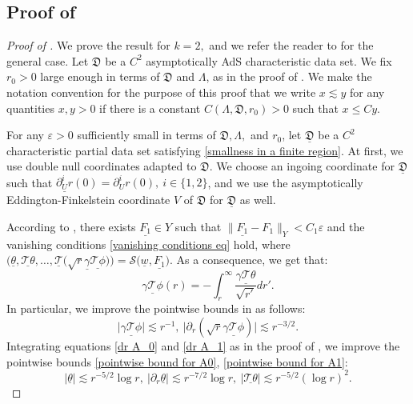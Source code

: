 \documentclass[11pt]{article}
\numberwithin{equation}{section}
\begin{document}
\subsection{Proof of }\label{extending local perturbations section}

\begin{proof}[Proof of ] We prove the result for $k=2,$ and we refer the reader to  for the general case. Let $\mathfrak{D}$ be a $C^2$ asymptotically AdS characteristic data set. We fix $r_0>0$ large enough in terms of $\mathfrak{D}$ and $\Lambda$, as in the proof of . We make the notation convention for the purpose of this proof that we write $x\lesssim y$ for any quantities $x,y>0$ if there is a constant $C(\Lambda,\mathfrak{D},r_0)>0$ such that $x\leq Cy.$

For any $\varepsilon>0$ sufficiently small in terms of $\mathfrak{D},\Lambda,$ and $r_0$, let $\underline{\mathfrak{D}}$ be a $C^2$ characteristic partial data set satisfying \eqref{smallness in a finite region}. At first, we use double null coordinates adapted to $\mathfrak{D}.$ We choose an ingoing coordinate for $\underline{\mathfrak{D}}$ such that $\underline{\partial_U^ir}(0)=\partial_U^ir(0),\ i\in\{1,2\}$, and we use the asymptotically Eddington-Finkelstein coordinate $V$ of  $\mathfrak{D}$ for $\underline{\mathfrak{D}}$ as well.

According to , there exists $\underline{F_1}\in Y$ such that $\|\underline{F_1}-F_1\|_{Y}<C_1\varepsilon$ and the vanishing conditions \eqref{vanishing conditions eq} hold, where $\big(\underline{\theta},\underline{\mathcal{T}\theta},\ldots,\underline{\mathcal{T}}\big(\sqrt{r}\underline{\gamma}\underline{\mathcal{T}\phi}\big)\big)=\mathcal{S}\big(\underline{w},\underline{F_1}\big).$ As a consequence, we get that:
\begin{equation}\label{Tphi using vanishing}
    \underline{\gamma\mathcal{T}\phi}(r)=-\int_{r}^{\infty}\frac{\underline{\gamma\mathcal{T}\theta}}{\sqrt{r'}}dr'.
\end{equation}
In particular, we improve the pointwise bounds in  as follows:
\[\big|\underline{\gamma\mathcal{T}\phi}\big|\lesssim r^{-1},\ \big|\partial_r(\sqrt{r}\underline{\gamma\mathcal{T}\phi})\big|\lesssim r^{-3/2}.\]
Integrating equations \eqref{dr A_0} and \eqref{dr A_1} as in the proof of , we improve the pointwise bounds \eqref{pointwise bound for A0}, \eqref{pointwise bound for A1}:
\begin{equation}\label{imrpoved pointwise bounds for theta Ttheta}
    |\underline{\theta}|\lesssim r^{-5/2}\log r,\ |\partial_r\underline{\theta}|\lesssim r^{-7/2}\log r,\ |\underline{\mathcal{T}\theta}|\lesssim r^{-5/2}(\log r)^2.
\end{equation}


\end{proof}
\end{document}
